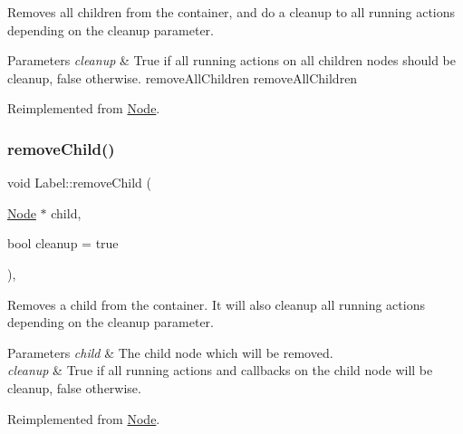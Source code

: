 Removes all children from the container, and do a cleanup to all running actions depending on the cleanup parameter.


\begin{DoxyParams}{Parameters}
{\em cleanup} & True if all running actions on all children nodes should be cleanup, false otherwise.  remove\+All\+Children  remove\+All\+Children \\
\hline
\end{DoxyParams}


Reimplemented from \hyperlink{classNode_aca66e2b385c3dbf1a6f55627c4a13192}{Node}.

\mbox{\label{classLabel_a2fc940a01f34e1ea809bb09e1f82575f}} 
\subsubsection{\texorpdfstring{remove\+Child()}{removeChild()}\hspace{0.1cm}{\footnotesize\ttfamily [1/2]}}
{\footnotesize\ttfamily void Label\+::remove\+Child (\begin{DoxyParamCaption}\item[{\hyperlink{classNode}{Node} $\ast$}]{child,  }\item[{bool}]{cleanup = {\ttfamily true} }\end{DoxyParamCaption})\hspace{0.3cm}{\ttfamily [override]}, {\ttfamily [virtual]}}

Removes a child from the container. It will also cleanup all running actions depending on the cleanup parameter.


\begin{DoxyParams}{Parameters}
{\em child} & The child node which will be removed. \\
\hline
{\em cleanup} & True if all running actions and callbacks on the child node will be cleanup, false otherwise. \\
\hline
\end{DoxyParams}


Reimplemented from \hyperlink{classNode_a872d4a7d389b26b0c6ad7ed99c8b1b65}{Node}.

\mbox{\label{classLabel_adbd0b3a732d798e37ee50faa99453647}} 
